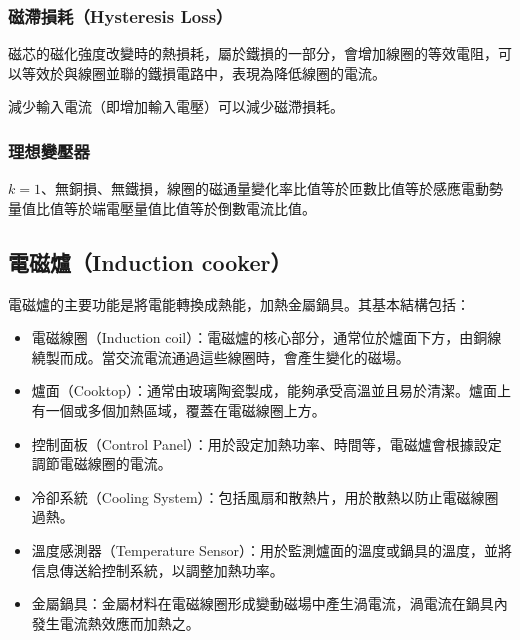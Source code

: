 \documentclass[a4paper,12pt]{report}
\begin{document}
\begin{itemize}
\subsubsection{磁滯損耗（Hysteresis Loss）}
磁芯的磁化強度改變時的熱損耗，屬於鐵損的一部分，會增加線圈的等效電阻，可以等效於與線圈並聯的鐵損電路中，表現為降低線圈的電流。

減少輸入電流（即增加輸入電壓）可以減少磁滯損耗。
\subsubsection{理想變壓器}
$k=1$、無銅損、無鐵損，線圈的磁通量變化率比值等於匝數比值等於感應電動勢量值比值等於端電壓量值比值等於倒數電流比值。
\subsection{電磁爐（Induction cooker）}
電磁爐的主要功能是將電能轉換成熱能，加熱金屬鍋具。其基本結構包括：
\begin{itemize}
\item 電磁線圈（Induction coil）：電磁爐的核心部分，通常位於爐面下方，由銅線繞製而成。當交流電流通過這些線圈時，會產生變化的磁場。
\item 爐面（Cooktop）：通常由玻璃陶瓷製成，能夠承受高溫並且易於清潔。爐面上有一個或多個加熱區域，覆蓋在電磁線圈上方。
\item 控制面板（Control Panel）：用於設定加熱功率、時間等，電磁爐會根據設定調節電磁線圈的電流。
\item 冷卻系統（Cooling System）：包括風扇和散熱片，用於散熱以防止電磁線圈過熱。
\item 溫度感測器（Temperature Sensor）：用於監測爐面的溫度或鍋具的溫度，並將信息傳送給控制系統，以調整加熱功率。
\item 金屬鍋具：金屬材料在電磁線圈形成變動磁場中產生渦電流，渦電流在鍋具內發生電流熱效應而加熱之。
\end{itemize}

\end{itemize}
\end{document}
